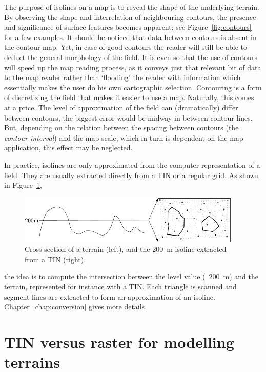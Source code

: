 The purpose of isolines on a map is to reveal the shape of the underlying terrain. 
By observing the shape and interrelation of neighbouring contours, the presence and significance of surface features becomes apparent; see Figure~\ref{fig:contours} for a few examples.
It should be noticed that data between contours is absent in the contour map. 
Yet, in case of good contours the reader will still be able to deduct the general morphology of the field. 
It is even so that the use of contours will speed up the map reading process, as it conveys just that relevant bit of data to the map reader rather than `flooding' the reader with information which essentially makes the user do his own cartographic selection. 
Contouring is a form of discretizing the field that makes it easier to use a map. 
Naturally, this comes at a price. 
The level of approximation of the field can (dramatically) differ between contours, the biggest error would be midway in between contour lines. 
But, depending on the relation between the spacing between contours (the \emph{contour interval}) and the map scale, which in turn is dependent on the map application, this effect may be neglected.


%

In practice, isolines are only approximated from the computer representation of a field.
They are usually extracted directly from a TIN or a regular grid. 
As shown in Figure~\ref{fig:isoline},
\begin{figure}
  \centering
  \includegraphics[width=0.95\textwidth]{figs/isoline}
  \caption{Cross-section of a terrain (left), and the \qty{200}{\metre} isoline extracted from a TIN (right).} 
\label{fig:isoline}
\end{figure}
the idea is to compute the intersection between the level value (\eg\ \qty{200}{m}) and the terrain, represented for instance with a TIN\@. 
Each triangle is scanned and segment lines are extracted to form an approximation of an isoline.
Chapter~\ref{chap:conversion} gives more details.

%
\section[TIN versus raster]{TIN versus raster for modelling terrains}

